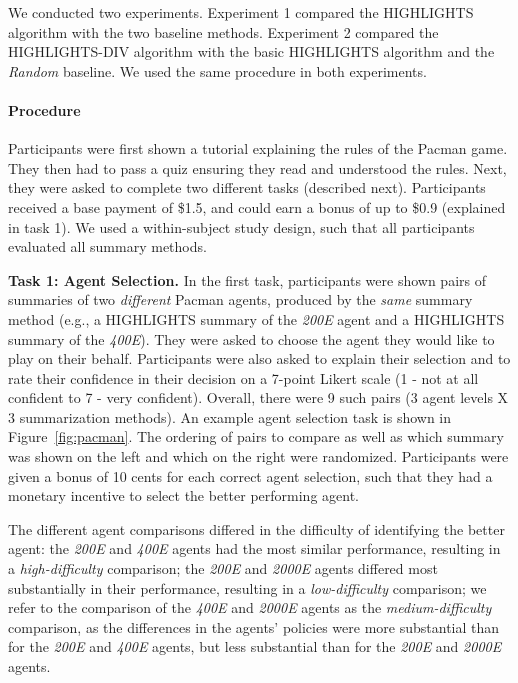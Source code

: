 We conducted two experiments. Experiment 1 compared the HIGHLIGHTS algorithm with the two baseline methods. Experiment 2 compared the HIGHLIGHTS-DIV algorithm with the basic HIGHLIGHTS algorithm and the \emph{Random} baseline. We used the same procedure in both experiments. 

\paragraph{Procedure}
Participants were first shown a tutorial explaining the rules of the Pacman game. They then had to pass a quiz ensuring they read and understood the rules. Next, they were asked to complete two different tasks (described next). Participants received a base payment of \$1.5, and could earn a bonus of up to \$0.9 (explained in task 1). We used a within-subject study design, such that all participants evaluated all summary methods. 

\textbf{Task 1: Agent Selection.}
In the first task, participants were shown pairs of  summaries of two \emph{different} Pacman agents, produced by the \emph{same} summary method (e.g., a HIGHLIGHTS summary of the \emph{200E} agent and a HIGHLIGHTS summary of the \emph{400E}). They were asked to choose the agent they would like to play on their behalf. Participants were also asked to explain their selection and to rate their confidence in their decision on a 7-point Likert scale (1 - not at all confident to 7 - very confident). Overall, there were 9 such pairs (3 agent levels X 3 summarization methods).  An example agent selection task is shown in Figure~\ref{fig:pacman}. The ordering of pairs to compare as well as which summary was shown on the left and which on the right were randomized. Participants were given a bonus of 10 cents for each correct agent selection, such that they had a monetary incentive to select the better performing agent. 

The different agent comparisons differed in the difficulty of identifying the better agent: the \emph{200E} and \emph{400E} agents had the most similar performance, resulting in a \emph{high-difficulty} comparison; the \emph{200E} and \emph{2000E} agents differed most substantially in their performance, resulting in a \emph{low-difficulty} comparison; we refer to the comparison of  the \emph{400E} and \emph{2000E} agents as the \emph{medium-difficulty} comparison, as the differences in the agents' policies were more substantial than for the \emph{200E} and \emph{400E} agents, but less substantial than for the \emph{200E} and \emph{2000E} agents. 

